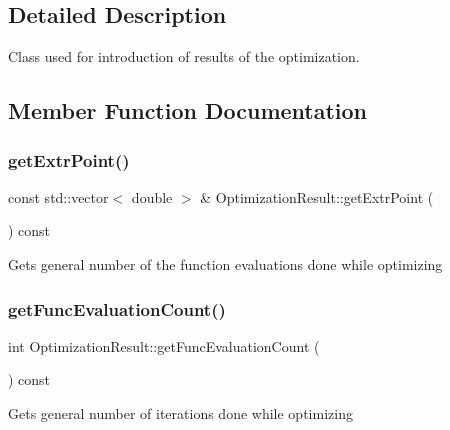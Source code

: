 \subsection{Detailed Description}
Class used for introduction of results of the optimization. 

\subsection{Member Function Documentation}
\mbox{\label{class_optimization_result_a9f3d52b480c6538cd8a2da8aa127dfc8}} 
\subsubsection{\texorpdfstring{get\+Extr\+Point()}{getExtrPoint()}}
{\footnotesize\ttfamily const std\+::vector$<$ double $>$ \& Optimization\+Result\+::get\+Extr\+Point (\begin{DoxyParamCaption}{ }\end{DoxyParamCaption}) const}

Gets general number of the function evaluations done while optimizing \mbox{\label{class_optimization_result_a6f26683de442f45b95462b0dba44d737}} 
\subsubsection{\texorpdfstring{get\+Func\+Evaluation\+Count()}{getFuncEvaluationCount()}}
{\footnotesize\ttfamily int Optimization\+Result\+::get\+Func\+Evaluation\+Count (\begin{DoxyParamCaption}{ }\end{DoxyParamCaption}) const}

Gets general number of iterations done while optimizing \mbox{\label{class_optimization_result_aab232c5a51fb404c8e1de38b533e617d}} 
